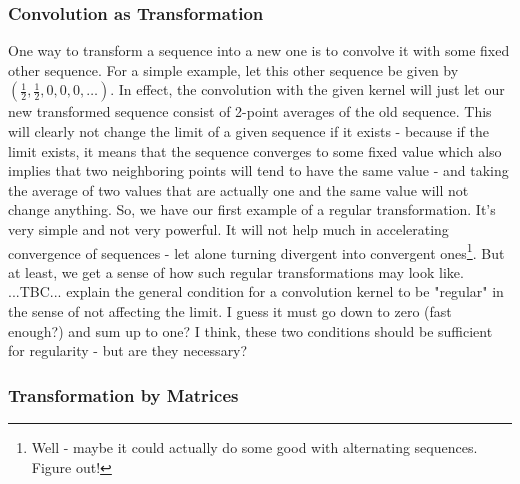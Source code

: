 \subsubsection{Convolution as Transformation}
One way to transform a sequence into a new one is to convolve it with some fixed other sequence. For a simple example, let this other sequence be given by $(\frac{1}{2}, \frac{1}{2}, 0, 0, 0, \ldots)$. In effect, the convolution with the given kernel will just let our new transformed sequence consist of 2-point averages of the old sequence. This will clearly not change the limit of a given sequence if it exists - because if the limit exists, it means that the sequence converges to some fixed value which also implies that two neighboring points will tend to have the same value - and taking the average of two values that are actually one and the same value will not change anything. So, we have our first example of a regular transformation. It's very simple and not very powerful. It will not help much in accelerating convergence of sequences - let alone turning divergent into convergent ones\footnote{Well - maybe it could actually do some good with alternating sequences. Figure out!}. But at least, we get a sense of how such regular transformations may look like. ...TBC... explain the general condition for a convolution kernel to be "regular" in the sense of not affecting the limit. I guess it must go down to zero (fast enough?) and sum up to one? I think, these two conditions should be sufficient for regularity - but are they necessary? 

\subsubsection{Transformation by Matrices}



